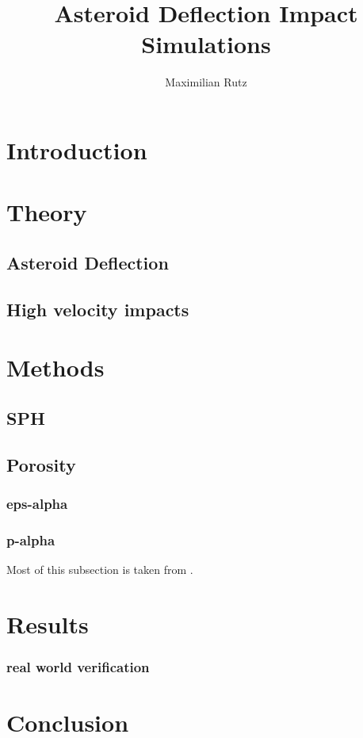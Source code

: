 \documentclass{article}
\title{Asteroid Deflection Impact Simulations}
\author{Maximilian Rutz}
\date{}
\begin{document}
	\maketitle
	\begin{abstract}
	 
	\end{abstract}
	
	\newpage
	\tableofcontents
	 
	\newpage
	\section{Introduction} 
	\section{Theory}
		\subsection{Asteroid Deflection}
		\subsection{High velocity impacts}
	\section{Methods}
		\subsection{SPH}
		\subsection{Porosity}
		\subsubsection{eps-alpha}
		\subsubsection{p-alpha}
		Most of this subsection is taken from \cite{Jutzi_p_alpha_1}.		 
	\section{Results}
		\subsubsection{real world verification}
	\section{Conclusion}
	
	\newpage 
	\printbibliography
 
\end{document}
